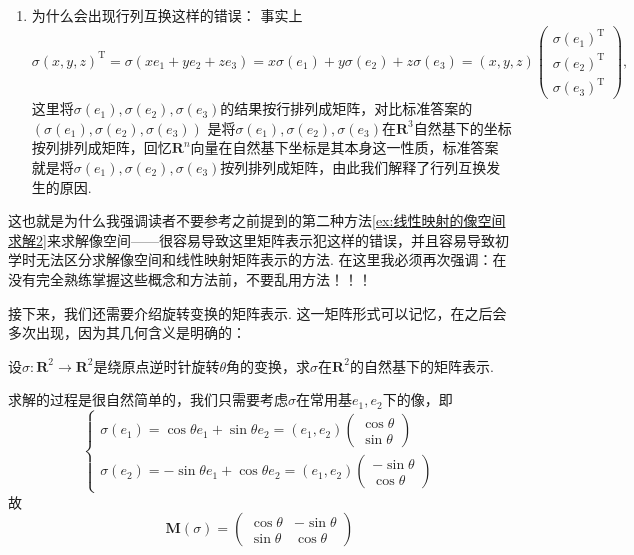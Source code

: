\begin{enumerate}
    \item 为什么会出现行列互换这样的错误：
          事实上
          \[
            \sigma(x,y,z)^{\mathrm{T}}
            =\sigma(xe_1+ye_2+ze_3)
            =x\sigma(e_1)+y\sigma(e_2)+z\sigma(e_3)
            =(x,y,z)
            \begin{pmatrix}
                \sigma(e_1)^{\mathrm{T}} \\
                \sigma(e_2)^{\mathrm{T}} \\
                \sigma(e_3)^{\mathrm{T}}
            \end{pmatrix},
          \]
        这里将$\sigma(e_1),\sigma(e_2),\sigma(e_3)$的结果按行排列成矩阵，对比标准答案的 $(\sigma(e_1), \sigma(e_2), \sigma(e_3))$ 是将$\sigma(e_1),\sigma(e_2),\sigma(e_3)$在$\mathbf{R}^3$自然基下的坐标按列排列成矩阵，回忆$\mathbf{R}^n$向量在自然基下坐标是其本身这一性质，标准答案就是将$\sigma(e_1),\sigma(e_2),\sigma(e_3)$按列排列成矩阵，由此我们解释了行列互换发生的原因.
\end{enumerate}

这也就是为什么我强调读者不要参考之前提到的第二种方法\autoref{ex:线性映射的像空间求解2}来求解像空间——很容易导致这里矩阵表示犯这样的错误，并且容易导致初学时无法区分求解像空间和线性映射矩阵表示的方法. 在这里我必须再次强调：在没有完全熟练掌握这些概念和方法前，不要乱用方法！！！

接下来，我们还需要介绍旋转变换的矩阵表示. 这一矩阵形式可以记忆，在之后会多次出现，因为其几何含义是明确的：
\begin{example}{}{}
    设$\sigma\colon\mathbf{R}^2\to\mathbf{R}^2$是绕原点逆时针旋转$\theta$角的变换，求$\sigma$在$\mathbf{R}^2$的自然基下的矩阵表示.
\end{example}
\begin{solution}
    求解的过程是很自然简单的，我们只需要考虑$\sigma$在常用基$e_1,e_2$下的像，即
    \[
    \begin{cases}
        \sigma(e_1)=\cos\theta e_1+\sin\theta e_2=(e_1,e_2)\begin{pmatrix}
            \cos\theta \\ \sin\theta
        \end{pmatrix} \\
        \sigma(e_2)=-\sin\theta e_1+\cos\theta e_2=(e_1,e_2)\begin{pmatrix}
            -\sin\theta \\ \cos\theta
        \end{pmatrix}
    \end{cases}
    \]
    故
    \[\mathbf{M}(\sigma)=\begin{pmatrix}
        \cos\theta & -\sin\theta \\
        \sin\theta & \cos\theta
    \end{pmatrix}\]

\end{solution}

